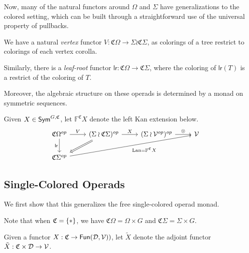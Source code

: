 \documentclass[a4paper,10pt
,draft
]{article}%
\renewcommand{\1}{\ensuremath{\mathbb{id}}}
\begin{document}
Now, many of the natural functors around $\Omega$ and $\Sigma$ have generalizations to the colored setting,
which can be built through a straightforward use of the universal property of pullbacks.

\begin{definition}
      We have a natural \textit{vertex} functor
      $V: \mathfrak C \Omega \to \Sigma \wr \mathfrak C \Sigma$,
      as colorings of a tree restrict to colorings of each vertex corolla.

      Similarly, there is a \textit{leaf-root} functor
      $\mathsf{lr}: \mathfrak C \Omega \to \mathfrak C \Sigma$,
      where the coloring of $\mathsf{lr}(T)$ is a restrict of the coloring of $T$.
\end{definition}



Moreover, the algebraic structure on these operads is determined by a monad on symmetric sequences.

\begin{definition}
      Given $X \in \mathsf{Sym}^{G, \mathfrak C}$, let $\mathbb F^{\mathfrak C} X$ denote the left Kan extension below.
      \begin{equation} 
           \begin{tikzcd}
                  \mathfrak C \Omega^{op}
                  \arrow[d, "\mathsf{lr}"']
                  \arrow[r, "V"]
                  &
                  (\Sigma \wr \mathfrak C \Sigma)^{op} \arrow[r, "X"]
                  \arrow[dl, Rightarrow]
                  &
                  (\Sigma \wr \V^{op})^{op} \arrow[r, "\otimes"]
                  &
                  \V
                  \\
                  \mathfrak C \Sigma^{op} \arrow[urrr, "\Lan = \mathbb F^{\mathfrak C} X"']
            \end{tikzcd}
      \end{equation}
\end{definition}

\subsection{Single-Colored Operads}
We first show that this generalizes the free single-colored operad monad.

Note that when $\mathfrak C = \set{\**}$, we have
$\mathfrak C \Omega = \Omega \times G$ and 
$\mathfrak C \Sigma = \Sigma \times G$.

\begin{notation}
      Given a functor $X : \mathfrak C \to \mathsf{Fun}(\mathcal D, \mathcal V))$,
      let $\tilde X$ denote the adjoint functor $\tilde X: \mathfrak C \times \mathcal D \to \mathcal V$.
\end{notation}
\end{document}
